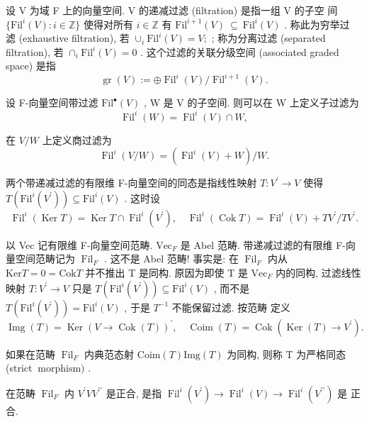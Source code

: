 \documentclass[]{article}
\begin{document}
{设 V 为域 F 上的向量空间. V 的递减过滤 (filtration) 是指一组 V 的子空 间 $\{ \mathrm { F i l } ^ { i } ( V ) : i \in \mathbb { Z } \}$ 使得对所有 $i \in \mathbb Z$ 有 ${ \mathrm { F i l } } ^ { i + 1 } ( V ) ~ \subseteq ~ { \mathrm { F i l } } ^ { i } ( V )$ . 称此为穷举过 滤 (exhaustive filtration), 若 $\cup _ { i } \mathrm { F i l } ^ { i } ( V ) = V ;$ ; 称为分离过滤 (separated filtration), 若 $\cap _ { i } { \mathrm { F i l } } ^ { i } ( V ) = 0$ . 这个过滤的关联分级空间 (associated graded space) 是指$$
\operatorname{gr} (V) := \oplus \operatorname{Fil} ^ {i} (V) / \operatorname{Fil} ^ {i + 1} (V).
$$

设 F-向量空间带过滤 ${ \mathrm { F i l } } ^ { \bullet } ( V )$ , W 是 V 的子空间. 则可以在 W 上定义子过滤为$$
\operatorname{Fil} ^ {i} (W) = \operatorname{Fil} ^ {i} (V) \cap W,
$$

在 $V / W$ 上定义商过滤为$$
\operatorname{Fil} ^ {i} (V / W) = (\operatorname{Fil} ^ {i} (V) + W) / W.
$$

两个带递减过滤的有限维 F-向量空间的同态是指线性映射 $T : V ^ { \prime } \to V$ 使得 $T ( \mathrm { F i l } ^ { i } ( V ^ { \prime } ) ) \subseteq \mathrm { F i l } ^ { i } ( V )$ . 这时设 $$
\operatorname{Fil} ^ {i} (\operatorname{Ker} T) = \operatorname{Ker} T \cap \operatorname{Fil} ^ {i} (V ^ {\prime}), \quad \operatorname{Fil} ^ {i} (\operatorname{Cok} T) = \operatorname{Fil} ^ {i} (V) + T V ^ {\prime} / T V ^ {\prime}.
$$

以 Vec 记有限维 F-向量空间范畴. ${ \mathrm { V e c } } _ { F }$ 是 Abel 范畴. 带递减过滤的有限维 F-向量空间范畴记为 $\operatorname { F i l } _ { F }$ . 这不是 Abel 范畴! 事实是: 在 $\operatorname { F i l } _ { F }$ 内从 $\mathrm { K e r } T = 0 = \mathrm { C o k } T$ 并不推出 T 是同构. 原因为即使 T 是 ${ \mathrm { V e c } } _ { F }$ 内的同构, 过滤线性映射 $T : V ^ { \prime } \to V$ 只是 $T ( \mathrm { F i l } ^ { i } ( V ^ { \prime } ) ) \subseteq \mathrm { F i l } ^ { i } ( V )$ , 而不是 $T ( \mathrm { F i l } ^ { i } ( V ^ { \prime } ) ) = \mathrm { F i l } ^ { i } ( V )$ , 于是 $T ^ { - 1 }$ 不能保留过滤. 按范畴 定义$$
\operatorname{Img} (T) = \operatorname{Ker} (V \to \operatorname{Cok} (T)) ^ {\prime}, \quad \operatorname{Coim} (T) = \operatorname{Cok} (\operatorname{Ker} (T) \to V ^ {\prime}).
$$

如果在范畴 $\operatorname { F i l } _ { F }$ 内典范态射 $\mathrm { C o i m } ( T )  \mathrm { I m g } ( T )$ 为同构, 则称 T 为严格同态 (strict $\mathrm { \ m o r p h i s m ) }$ . 

在范畴 $\operatorname { F i l } _ { F }$ 内 $V ^ { \prime }  V  V ^ { \prime \prime }$ 是正合, 是指 $\operatorname { F i l } ^ { i } ( V ^ { \prime } ) \to \operatorname { F i l } ^ { i } ( V ) \to \operatorname { F i l } ^ { i } ( V ^ { \prime \prime } )$ 是 正合. 

}
\end{document}
